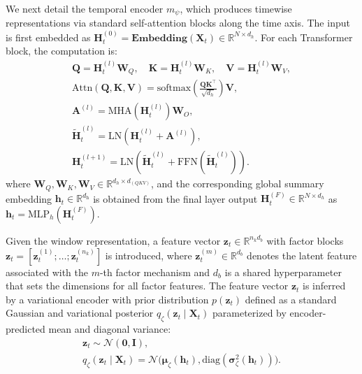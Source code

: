 ﻿\documentclass[journal]{IEEEtran}
\begin{document}
We next detail the temporal encoder $m_{\psi}$, which produces timewise representations via standard self-attention blocks along the time axis. The input is first embedded as $\mathbf{H}_t^{(0)}=\mathbf{Embedding}(\mathbf{X}_t)\in\mathbb{R}^{N\times d_h}$. For each Transformer block, the computation is:
\begin{equation}
\begin{gathered}
\mathbf{Q}=\mathbf{H}_t^{(l)}\mathbf{W}_Q,\quad \mathbf{K}=\mathbf{H}_t^{(l)}\mathbf{W}_K,\quad \mathbf{V}=\mathbf{H}_t^{(l)}\mathbf{W}_V,\\
\mathrm{Attn}(\mathbf{Q},\mathbf{K},\mathbf{V})=\mathrm{softmax}\!\left(\frac{\mathbf{Q}\mathbf{K}^{\top}}{\sqrt{d_h}}\right)\mathbf{V},\\
\mathbf{A}^{(l)}=\mathrm{MHA}(\mathbf{H}_t^{(l)})\mathbf{W}_O,\\
\widetilde{\mathbf{H}}_t^{(l)}=\mathrm{LN}\!\left(\mathbf{H}_t^{(l)}+\mathbf{A}^{(l)}\right),\\
\mathbf{H}_t^{(l+1)}=\mathrm{LN}\!\left(\widetilde{\mathbf{H}}_t^{(l)}+\mathrm{FFN}\!\left(\widetilde{\mathbf{H}}_t^{(l)}\right)\right).
\end{gathered}
\end{equation}
where $\mathbf{W}_Q,\mathbf{W}_K,\mathbf{W}_V\in\mathbb{R}^{d_h\times d_{(QKV)}}$, and the corresponding global summary embedding $\mathbf{h}_t\in\mathbb{R}^{d_{\mathrm{h}}}$ is obtained from the final layer output $\mathbf{H}_t^{(F)}\in\mathbb{R}^{N\times d_h}$ as $\mathbf{h}_t=\mathrm{MLP}_{h}\!\left(\mathbf{H}_t^{(F)}\right)$.

Given the window representation, a feature vector $\mathbf{z}_t\in\mathbb{R}^{n_k d_b}$ with factor blocks $\mathbf{z}_t=[\mathbf{z}^{(1)}_t;\dots;\mathbf{z}^{(n_k)}_t]$ is introduced, where $\mathbf{z}^{(m)}_t\in\mathbb{R}^{d_b}$ denotes the latent feature associated with the $m$-th factor mechanism and $d_b$ is a shared hyperparameter that sets the dimensions for all factor features. The feature vector $\mathbf{z}_t$ is inferred by a variational encoder with prior distribution $p(\mathbf{z}_t)$ defined as a standard Gaussian and variational posterior $q_{\zeta}(\mathbf{z}_t\mid \mathbf{X}_t)$ parameterized by encoder-predicted mean and diagonal variance:
\begin{equation}
\begin{gathered}
\mathbf{z}_t\sim\mathcal{N}(\mathbf{0},\mathbf{I}),\\
q_{\zeta }(\mathbf{z}_t\mid\mathbf{X}_t)=\mathcal{N}\!\big(\boldsymbol{\mu}_{\zeta}(\mathbf{h}_t),\mathrm{diag}(\boldsymbol{\sigma}^2_{\zeta}(\mathbf{h}_t))\big).
\end{gathered}
\end{equation}
\end{document}
